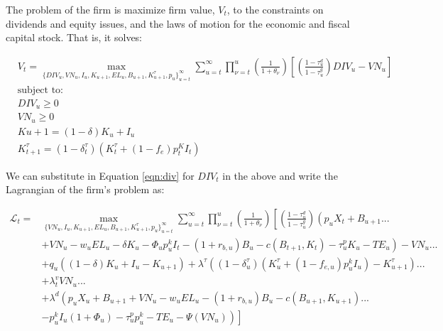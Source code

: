 The problem of the firm is maximize firm value, $V_{t}$, to the constraints on dividends and equity issues, and the laws of motion for the economic and fiscal capital stock.  That is, it solves:

\begin{equation}
\label{eqn:V_max}
\begin{split}
        &V_{t}= \max_{\{DIV_{u},VN_{u}, I_{u}, K_{u+1}, EL_{u}, B_{u+1}, K^{\tau}_{u+1},p_{u}\}^{\infty}_{u=t}} \sum_{u=t}^{\infty} \prod_{\nu=t}^{u}\left(\frac{1}{1+\theta_{\nu}}\right)\left[ \left(\frac{1-\tau^{d}_{u}}{1-\tau^{g}_{u}}\right)DIV_{u}-VN_{u}\right]\\
        &\text{subject to:} \\
        &DIV_{u}\geq 0\\
        &VN_{u}\geq 0\\
        &K{u+1}=(1-\delta)K_{u}+ I_{u} \\
        &K^{\tau}_{t+1}=(1-\delta^{\tau}_{t})(K^{\tau}_{t} + (1-f_{e})p^{K}_{t}I_{t})
      \end{split}
    \end{equation}

We can substitute in Equation \ref{eqn:div} for $DIV_{t}$ in the above and write the Lagrangian of the firm's problem as:

 \begin{equation}
\label{eqn:lagrangian}
\begin{split}
\mathcal{L}_{t} =& \max_{\{VN_{u}, I_{u}, K_{u+1}, EL_{u}, B_{u+1}, K^{\tau}_{u+1},p_{u}\}^{\infty}_{u=t}}   \sum_{u=t}^{\infty} \prod_{\nu=t}^{u}\left(\frac{1}{1+\theta_{\nu}}\right) \left[ \left(\frac{1-\tau^{d}_{u}}{1-\tau^{g}_{u}}\right) \left(p_{u}X_{t}+ B_{u+1}... \right. \right. \\
& \left. \left.  + VN_{u}-w_{u}EL_{u}-\delta K_{u} -\Phi_{u}p^{k}_{u}I_{t}-(1+r_{b,u})B_{u} - c(B_{t+1},K_{t})-\tau^{p}_{u}K_{u}-TE_{u}\right)  - VN_{u} ...\right. \\
&\left. + q_{u}\left((1-\delta)K_{u}+I_{u}-K_{u+1}\right) + \lambda^{\tau}\left((1-\delta^{\tau}_{u})(K^{\tau}_{u}+(1-f_{e,u})p^{k}_{u}I_{u})-K^{\tau}_{u+1}\right) ...\right. \\
& \left.+ \lambda^{v}_{t}VN_{u} ... \right. \\
& \left. + \lambda^{d}\left(p_{u}X_{u}+ B_{u+1} + VN_{u} - w_{u}EL_{u} - (1+r_{b,u})B_{u} - c(B_{u+1},K_{u+1})... \right.\right.\\
& \left.\left. - p^{k}_{u}I_{u}(1+\Phi_{u}) - \tau^{p}_{u}p^{k}_{u} - TE_{u} -\Psi(VN_{u})\right) \right]
\end{split}
\end{equation}

